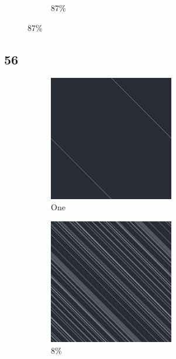 \documentclass[12pt, fleqn]{report}                             %
\theoremstyle{break}                                            %
\begin{document}
\begin{figure}[ht!]
\begin{subfigure}[b]{0.4\linewidth}
          \caption{87\%}
        \end{subfigure}
      \end{figure}


      \clearpage
      \subsection{56}
      \begin{figure}[ht!]
        \centering
        \begin{subfigure}[b]{0.4\linewidth}
          \includegraphics[width=0.6\textwidth]{Images/56/a.png}
          \caption{One}
        \end{subfigure}
        \begin{subfigure}[b]{0.4\linewidth}
          \includegraphics[width=0.6\textwidth]{Images/56/b.png}
          \caption{8\%}
        \end{subfigure}
        \begin{subfigure}[b]{0.4\linewidth}

\end{subfigure}
\end{figure}
\end{document}
